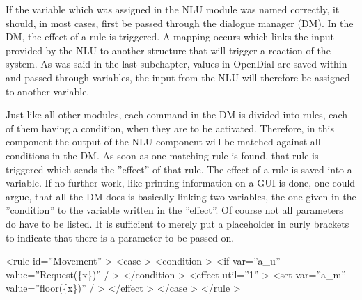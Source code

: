 \documentclass[a4paper, 12pt]{article}
\begin{document}
If the variable which was assigned in the NLU module was named correctly, it should, in most cases, first be passed through the dialogue manager (DM).
In the DM, the effect of a rule is triggered. A mapping occurs which links the input provided by the NLU to another structure that will trigger a reaction of the system.
As was said in the last subchapter, values in OpenDial are saved within and passed through variables, the input from the NLU will therefore be assigned to another variable. \newline

Just like all other modules, each command in the DM is divided into rules, each of them having a condition, when they are to be activated.
Therefore, in this component the output of the NLU component will be matched against all conditions in the DM.
   As soon as one matching rule is found, that rule is triggered which sends the ”effect” of that rule.
   The effect of a rule is saved into a variable.
   If no further work, like printing information on a GUI is done, one could argue, that all the DM does is basically linking two variables, the one given in the ”condition” to the variable written in the ”effect”.
   Of course not all parameters do have to be listed.
   It is sufficient to merely put a placeholder in curly brackets to indicate that there is a parameter to be passed on. \newline


   \textless rule id=”Movement” \textgreater \newline
    \indent \indent \textless case \textgreater \newline
    \indent \indent \indent \textless condition \textgreater \newline
    \indent \indent \indent \indent \textless if var=”a\_u” value=”Request(\{x\})” / \textgreater \newline
     \indent \indent \indent \textless /condition \textgreater \newline
      \indent \indent \indent \textless effect util=”1” \textgreater \newline
       \indent \indent \indent \indent \textless set var=”a\_m” value=”floor(\{x\})” / \textgreater \newline
        \indent \indent \indent \textless /effect \textgreater \newline
        \indent \indent \textless /case \textgreater \newline
        \indent \textless /rule \textgreater \newline
\end{document}
